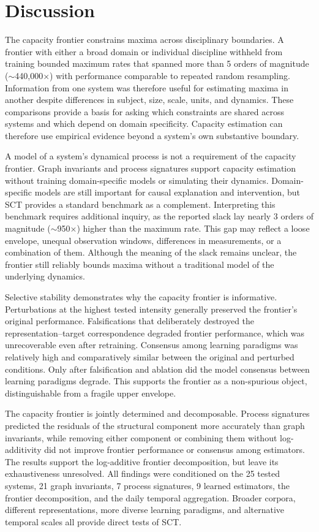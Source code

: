 \documentclass{article}
\begin{document}
\section*{Discussion}
\label{sec:discussion}

The capacity frontier constrains maxima across disciplinary boundaries. A frontier with either a broad domain or individual discipline withheld from training bounded maximum rates that spanned more than 5 orders of magnitude (${\sim}$440,000$\times$) with performance comparable to repeated random resampling. Information from one system was therefore useful for estimating maxima in another despite differences in subject, size, scale, units, and dynamics. These comparisons provide a basis for asking which constraints are shared across systems and which depend on domain specificity. Capacity estimation can therefore use empirical evidence beyond a system’s own substantive boundary.

A model of a system's dynamical process is not a requirement of the capacity frontier. Graph invariants and process signatures support capacity estimation without training domain-specific models or simulating their dynamics. Domain-specific models are still important for causal explanation and intervention, but SCT provides a standard benchmark as a complement. Interpreting this benchmark requires additional inquiry, as the reported slack lay nearly 3 orders of magnitude (${\sim}$950$\times$) higher than the maximum rate. This gap may reflect a loose envelope, unequal observation windows, differences in measurements, or a combination of them. Although the meaning of the slack remains unclear, the frontier still reliably bounds maxima without a traditional model of the underlying dynamics.

Selective stability demonstrates why the capacity frontier is informative. Perturbations at the highest tested intensity generally preserved the frontier's original performance. Falsifications that deliberately destroyed the representation–target correspondence degraded frontier performance, which was unrecoverable even after retraining. Consensus among learning paradigms was relatively high and comparatively similar between the original and perturbed conditions. Only after falsification and ablation did the model consensus between learning paradigms degrade. This supports the frontier as a non-spurious object, distinguishable from a fragile upper envelope.

The capacity frontier is jointly determined and decomposable. Process signatures predicted the residuals of the structural component more accurately than graph invariants, while removing either component or combining them without log-additivity did not improve frontier performance or consensus among estimators. The results support the log-additive frontier decomposition, but leave its exhaustiveness unresolved. All findings were conditioned on the 25 tested systems, 21 graph invariants, 7 process signatures, 9 learned estimators, the frontier decomposition, and the daily temporal aggregation. Broader corpora, different representations, more diverse learning paradigms, and alternative temporal scales all provide direct tests of SCT.
\end{document}
